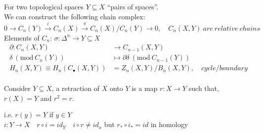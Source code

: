 \documentclass[11pt,a4paper]{report}
\begin{document}
                For two topological spaces $Y \subseteq X$ ``pairs of spaces''.\\
                We can construct the following chain complex: \\
                $0 \rightarrow C_n(Y) \xrightarrow{i} C_n(X) \xrightarrow{\pi} C_n(X) / C_n(Y) \rightarrow 0, \quad C_n(X, Y)\ are\ relative\ chains$ \\
                Elements of $C_n$: $\sigma: \Delta^n \rightarrow Y \subseteq X$ \\

                \newcommand{\Mod}[1]{\ (\mathrm{mod}\ #1)}
                \begin{align*}
                  \partial: C_n(X,Y) &\rightarrow C_{n-1}(X, Y)\\
                  \delta \Mod{C_n(Y)} &\mapsto \partial \delta \Mod{C_{n-1}(Y)}\\
                  H_n(X, Y) \equiv H_n(C_\bullet(X, Y)) &= Z_n(X, Y) / B_n(X, Y),\quad cycle / boundary\\
                \end{align*}


                \begin{defn}[Retraction]
                  Consider $Y \subseteq X $, a retraction of $X$ onto $Y$ is a map $r: X \rightarrow Y$ such that, $ r(X) = Y$ and $r^2 = r$.\\
                \end{defn}
                  i.e. $r(y) = Y$ if $y \in Y$\\
                  $i: Y \rightarrow X \quad r \circ i = id_Y \quad i \circ r \ne id_x$
                  but $r_* \circ i_* = id$ in homology\\
\end{document}
